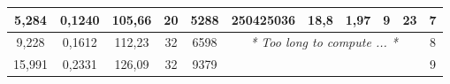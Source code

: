 \begin{sidewaystable}[]
\begin{tabular}{|c|c|c|c|c|ccccc|c|}
    5,284                                                                   & 0,1240                                                                 & 105,66                                                               & 20                                                              & 5288                                                            & \multicolumn{1}{c|}{250425036}                                                       & \multicolumn{1}{c|}{18,8}                                                                    & \multicolumn{1}{c|}{1,97}                                                                 & \multicolumn{1}{c|}{9}                                                                     & 23                                                                    & 7                                                              \\ \hline
    9,228                                                                   & 0,1612                                                                 & 112,23                                                               & 32                                                              & 6598                                                            & \multicolumn{5}{c|}{\multirow{3}{*}{\textit{* Too long to compute ... *}}}                                                                                                                                                                                                                                                                                                                                                                           & 8                                                              \\ \cline{1-5} \cline{11-11} 
    15,991                                                                  & 0,2331                                                                 & 126,09                                                               & 32                                                              & 9379                                                            & \multicolumn{5}{c|}{}                                                                                                                                                                                                                                                                                                                                                                                                                                & 9                                                              \\ \cline{1-5} \cline{11-11} 

\end{tabular}
\end{sidewaystable}
